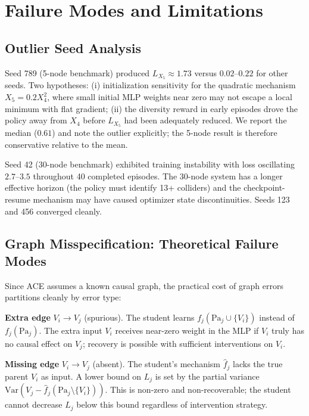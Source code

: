 \section{Failure Modes and Limitations}
\label{app:failures}

\subsection{Outlier Seed Analysis}
\label{app:outlier}

Seed 789 (5-node benchmark) produced $L_{X_5} \approx 1.73$ versus $0.02$--$0.22$ for other seeds. Two hypotheses: (i) initialization sensitivity for the quadratic mechanism $X_5 = 0.2 X_4^2$, where small initial MLP weights near zero may not escape a local minimum with flat gradient; (ii) the diversity reward in early episodes drove the policy away from $X_4$ before $L_{X_5}$ had been adequately reduced. We report the median ($0.61$) and note the outlier explicitly; the 5-node result is therefore conservative relative to the mean.

Seed 42 (30-node benchmark) exhibited training instability with loss oscillating $2.7$--$3.5$ throughout 40 completed episodes. The 30-node system has a longer effective horizon (the policy must identify 13+ colliders) and the checkpoint-resume mechanism may have caused optimizer state discontinuities. Seeds 123 and 456 converged cleanly.

\subsection{Graph Misspecification: Theoretical Failure Modes}
\label{app:misspec-failures}

Since ACE assumes a known causal graph, the practical cost of graph errors partitions cleanly by error type:

\textbf{Extra edge} $V_i \to V_j$ (spurious). The student learns $f_j(\text{Pa}_j \cup \{V_i\})$ instead of $f_j(\text{Pa}_j)$. The extra input $V_i$ receives near-zero weight in the MLP if $V_i$ truly has no causal effect on $V_j$; recovery is possible with sufficient interventions on $V_i$.

\textbf{Missing edge} $V_i \to V_j$ (absent). The student's mechanism $\hat{f}_j$ lacks the true parent $V_i$ as input. A lower bound on $L_j$ is set by the partial variance $\text{Var}(V_j - \hat{f}_j(\text{Pa}_j \setminus \{V_i\}))$. This is non-zero and non-recoverable; the student cannot decrease $L_j$ below this bound regardless of intervention strategy.

